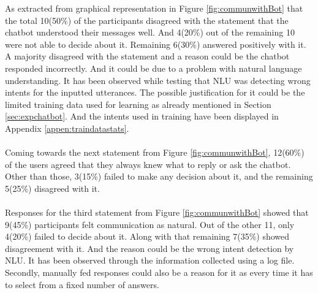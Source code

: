 \noindent
As extracted from graphical representation in Figure \ref{fig:communwithBot} that the total 10(50\%) of the participants disagreed with the statement that the chatbot understood their messages well. And 4(20\%) out of the remaining 10 were not able to decide about it. Remaining 6(30\%) answered positively with it. A majority disagreed with the statement and a reason could be the chatbot responded incorrectly. And it could be due to a problem with natural language understanding. It has been observed while testing that NLU was detecting wrong intents for the inputted utterances. The possible justification for it could be the limited training data used for learning as already mentioned in Section \ref{sec:expchatbot}. And the intents used in training have been displayed in Appendix \ref{appen:traindatastats}.
\\~\\
Coming towards the next statement from Figure \ref{fig:communwithBot}, 12(60\%) of the users agreed that they always knew what to reply or ask the chatbot. Other than those, 3(15\%) failed to make any decision about it, and the remaining 5(25\%) disagreed with it. 
\\~\\
Responses for the third statement from Figure \ref{fig:communwithBot} showed that 9(45\%) participants felt communication as natural. Out of the other 11, only 4(20\%) failed to decide about it. Along with that remaining 7(35\%) showed disagreement with it. And the reason could be the wrong intent detection by NLU. It has been observed through the information collected using a log file. Secondly, manually fed responses could also be a reason for it as every time it has to select from a fixed number of answers.

